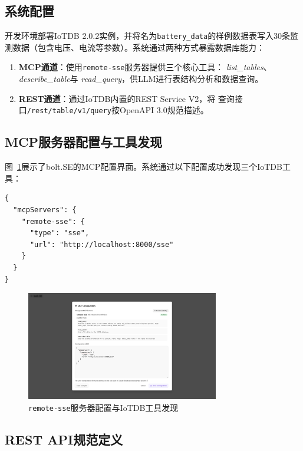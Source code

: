 \subsection{系统配置}

开发环境部署IoTDB 2.0.2实例，并将名为\texttt{battery\_data}的样例数据表写入30条监测数据（包含电压、电流等参数）。系统通过两种方式暴露数据库能力：

\begin{enumerate}
  \item \textbf{MCP通道}：使用\texttt{remote-sse}服务器提供三个核心工具：
        \textit{list\_tables}、\textit{describe\_table}与
        \textit{read\_query}，供LLM进行表结构分析和数据查询。
  \item \textbf{REST通道}：通过IoTDB内置的REST Service V2，将
        查询接口\texttt{/rest/table/v1/query}按OpenAPI 3.0规范描述。
\end{enumerate}

\subsection{MCP服务器配置与工具发现}

图~\ref{fig:mcp-config}展示了bolt.SE的MCP配置界面。系统通过以下配置成功发现三个IoTDB工具：

\begin{verbatim}
{
  "mcpServers": {
    "remote-sse": {
      "type": "sse",
      "url": "http://localhost:8000/sse"
    }
  }
}
\end{verbatim}

\begin{figure}[htbp]
  \centering
  \includegraphics[width=0.75\textwidth]{figures/screenshots/iotdb-demo/mcp-config.png}
  \caption{\texttt{remote-sse}服务器配置与IoTDB工具发现}
  \label{fig:mcp-config}
\end{figure}

\subsection{REST API规范定义}

